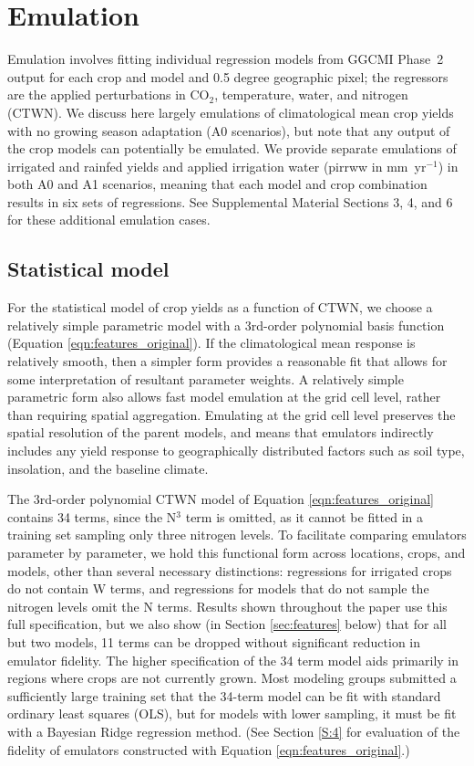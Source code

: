 \documentclass[gmdd]{copernicus} %
\begin{document}
\section{Emulation}
\label{S:3}
Emulation involves fitting individual regression models from GGCMI Phase~2 output for each crop and model and 0.5 degree geographic pixel; the regressors are the applied perturbations in CO$_2$, temperature, water, and nitrogen (CTWN). 
We discuss here largely emulations of climatological mean crop yields with no growing season adaptation (A0 scenarios), but note that any output of the crop models can potentially be emulated. 
We provide separate emulations of irrigated and rainfed yields and applied irrigation water (pirrww in mm\ yr$^{-1}$) in both A0 and A1 scenarios, meaning that each model and crop combination results in six sets of regressions. See Supplemental Material Sections 3, 4, and 6 for these additional emulation cases.

\subsection{Statistical model}
For the statistical model of crop yields as a function of CTWN, we choose a relatively simple parametric model with a 3rd-order polynomial basis function (Equation \ref{eqn:features_original}).
If the climatological mean response is relatively smooth, then a simpler form provides a reasonable fit that allows for some interpretation of resultant parameter weights. 
A relatively simple parametric form also allows fast model emulation at the grid cell level, rather than requiring spatial aggregation. 
Emulating at the grid cell level preserves the spatial resolution of the parent models, and means that emulators indirectly includes any yield response to geographically distributed factors such as soil type, insolation, and the baseline climate.

The 3rd-order polynomial CTWN model of Equation \ref{eqn:features_original} contains 34 terms, since the N$^3$ term is omitted, as it cannot be fitted in a training set sampling only three nitrogen levels. 
To facilitate comparing emulators parameter by parameter, we hold this functional form across locations, crops, and models, other than several necessary distinctions: regressions for irrigated crops do not contain W terms, and regressions for models that do not sample the nitrogen levels omit the N terms. 
Results shown throughout the paper use this full specification, but we also show (in Section \ref{sec:features} below) that for all but two models, 11 terms can be dropped without significant reduction in emulator fidelity. The higher specification of the 34 term model aids primarily in regions where crops are not currently grown. Most modeling groups submitted a sufficiently large training set that the 34-term model can be fit with standard ordinary least squares (OLS), but for models with lower sampling, it must be fit with a Bayesian Ridge regression method. (See Section \ref{S:4}  
for evaluation of the fidelity of emulators constructed with Equation \ref{eqn:features_original}.)
\end{document}
